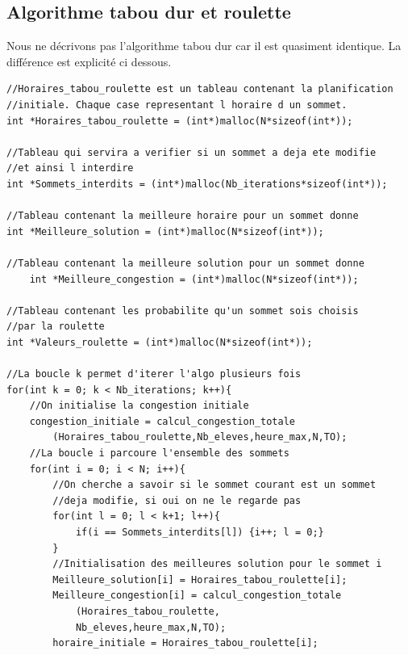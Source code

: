 \documentclass[a4paper,11pt]{article}
\begin{document}
		\subsection{Algorithme tabou dur et roulette}
			Nous ne décrivons pas l'algorithme tabou dur car il est quasiment identique. La différence est explicité ci dessous.
\begin{lstlisting}
//Horaires_tabou_roulette est un tableau contenant la planification 
//initiale. Chaque case representant l horaire d un sommet.
int *Horaires_tabou_roulette = (int*)malloc(N*sizeof(int*));

//Tableau qui servira a verifier si un sommet a deja ete modifie 
//et ainsi l interdire
int *Sommets_interdits = (int*)malloc(Nb_iterations*sizeof(int*));

//Tableau contenant la meilleure horaire pour un sommet donne
int *Meilleure_solution = (int*)malloc(N*sizeof(int*));

//Tableau contenant la meilleure solution pour un sommet donne
	int *Meilleure_congestion = (int*)malloc(N*sizeof(int*));

//Tableau contenant les probabilite qu'un sommet sois choisis
//par la roulette
int *Valeurs_roulette = (int*)malloc(N*sizeof(int*));
	
//La boucle k permet d'iterer l'algo plusieurs fois
for(int k = 0; k < Nb_iterations; k++){
	//On initialise la congestion initiale 
	congestion_initiale = calcul_congestion_totale
		(Horaires_tabou_roulette,Nb_eleves,heure_max,N,TO);
	//La boucle i parcoure l'ensemble des sommets
	for(int i = 0; i < N; i++){
		//On cherche a savoir si le sommet courant est un sommet 
		//deja modifie, si oui on ne le regarde pas
		for(int l = 0; l < k+1; l++){
			if(i == Sommets_interdits[l]) {i++; l = 0;}
		}
		//Initialisation des meilleures solution pour le sommet i
		Meilleure_solution[i] = Horaires_tabou_roulette[i];
		Meilleure_congestion[i] = calcul_congestion_totale
			(Horaires_tabou_roulette,
			Nb_eleves,heure_max,N,TO);
		horaire_initiale = Horaires_tabou_roulette[i];


\end{lstlisting}
\end{document}
